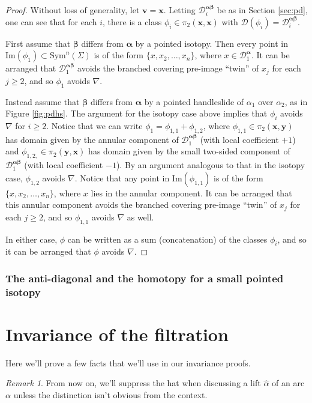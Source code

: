 \documentclass[11pt]{article}
\theoremstyle{plain} \newtheorem{thm}{Theorem}[subsection]
\theoremstyle{plain} \newtheorem{cor}[thm]{Corollary}
\theoremstyle{plain} \newtheorem{prop}[thm]{Proposition}
\theoremstyle{plain} \newtheorem{conj}[thm]{Conjecture}
\theoremstyle{plain} \newtheorem{lem}[thm]{Lemma}
\theoremstyle{definition} \newtheorem{df}[thm]{Definition}
\theoremstyle{remark} \newtheorem{rmk}[thm]{Remark}
\theoremstyle{remark} \newtheorem{obs}[thm]{Observation}
\newcommand{\DD}{\mathcal{D}}
\newcommand{\Dab}[1]{\DD^{\ba\bb}_{#1}}
\newcommand{\ah}{\widehat{\alpha}}
\newcommand{\ba}{\boldsymbol{\alpha}}
\newcommand{\bb}{\boldsymbol{\beta}}
\newcommand{\bx}{\mathbf{x}}
\newcommand{\by}{\mathbf{y}}
\newcommand{\bv}{\mathbf{v}}
\begin{document}
\begin{proof}
Without loss of generality, let $\bv = \bx$.  Letting $\mathcal{D}_i^{\ba\bb}$ be as in Section \ref{sec:pd}, one can see that for each $i$, there is a class $\phi_i \in \pi_2(\bx, \bx)$ with $\mathcal{D}(\phi_i) = \mathcal{D}_i^{\ba\bb}$.

First assume that $\bb$ differs from $\ba$ by a pointed isotopy.  Then every point in $\text{Im}(\phi_1) \subset \text{Sym}^n(\Sigma)$ is of the form $\{x, x_2, \ldots, x_n\}$, where $x \in \mathcal{D}_1^{\ba}$.  It can be arranged that $\mathcal{D}_1^{\ba\bb}$ avoids the branched covering pre-image ``twin'' of $x_j$ for each $j \geq 2$, and so $\phi_1$ avoids $\nabla$.

Instead assume that $\bb$ differs from $\ba$ by a pointed handleslide of $\alpha_1$ over $\alpha_2$, as in Figure \ref{fig:pdhs}.  The argument for the isotopy case above implies that $\phi_i$ avoids $\nabla$ for $i \geq 2$.  Notice that we can write $\phi_1 = \phi_{1,1} + \phi_{1,2}$, where $\phi_{1,1} \in \pi_2(\bx, \by)$ has domain given by the annular component of $\Dab{1}$ (with local coefficient $+1$) and $\phi_{1,2,} \in \pi_2(\by, \bx)$ has domain given by the small two-sided component of $\Dab{1}$ (with local coefficient $-1$).  By an argument analogous to that in the isotopy case, $\phi_{1,2}$ avoids $\nabla$.  Notice that any point in $\text{Im}(\phi_{1,1})$ is of the form $\{ x, x_2, \ldots, x_n\}$, where $x$ lies in the annular component.  It can be arranged that this annular component avoids the branched covering pre-image ``twin'' of $x_j$ for each $j \geq 2$, and so $\phi_{1,1}$ avoids $\nabla$ as well.

In either case, $\phi$ can be written as a sum (concatenation) of the classes $\phi_i$, and so it can be arranged that $\phi$ avoids $\nabla$. 
\end{proof}

\subsubsection{The anti-diagonal and the homotopy for a small pointed isotopy}


\section{Invariance of the filtration}\label{sec:inv}

Here we'll prove a few facts that we'll use in our invariance proofs.
\begin{rmk}\label{rmk:hats}
From now on, we'll suppress the hat when discussing a lift $\ah$ of an arc $\alpha$ unless the distinction isn't obvious from the context.
\end{rmk}
\end{document}
